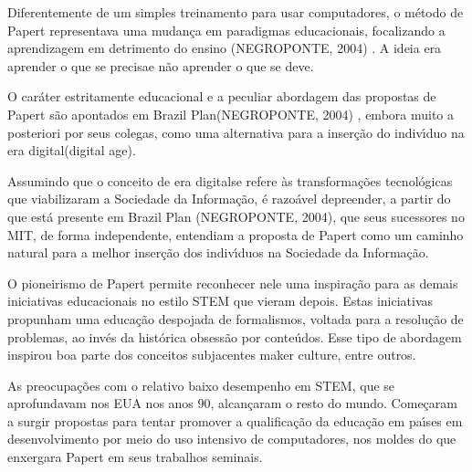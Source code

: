 \documentclass[
12pt,		%
openright,	%
twoside,  %
a4paper,			%
chapter=TITLE,		%
english,			%
french,				%
spanish,			%
brazil				%
]{USPSC-classe/USPSC}
\begin{document}
Diferentemente de um simples treinamento para usar computadores, o m\'etodo de Papert representava uma mudan\c{c}a em paradigmas educacionais, focalizando a aprendizagem em detrimento do ensino  (NEGROPONTE, 2004) . A ideia era \textquotedbl aprender o que se precisa\textquotedbl  e n\~ao \textquotedbl aprender o que se deve\textquotedbl .










O car\'ater estritamente educacional e a peculiar abordagem das propostas de Papert s\~ao apontados em \textquotedbl Brazil Plan\textquotedbl   (NEGROPONTE, 2004) , embora muito a posteriori por seus colegas, como uma alternativa para a inser\c{c}\~ao do indiv\'{\i}duo na \textquotedbl era digital\textquotedbl  (digital age).










Assumindo que o conceito de \textquotedbl era digital\textquotedbl  se refere \`as transforma\c{c}\~oes tecnol\'ogicas que viabilizaram a  \textquotedbl Sociedade da Informa\c{c}\~ao\textquotedbl ,  \'e razo\'avel depreender, a partir do que est\'a presente em Brazil Plan  (NEGROPONTE, 2004), que seus sucessores no MIT, de forma independente, entendiam a proposta de Papert como um caminho natural para a melhor inser\c{c}\~ao dos indiv\'{\i}duos na Sociedade da Informa\c{c}\~ao.










O pioneirismo de Papert permite reconhecer nele uma inspira\c{c}\~ao para as demais iniciativas educacionais no estilo STEM que vieram depois. Estas iniciativas propunham uma educa\c{c}\~ao despojada de formalismos, voltada para a resolu\c{c}\~ao de problemas, ao inv\'es da hist\'orica obsess\~ao por conte\'udos. Esse tipo de abordagem inspirou boa parte dos conceitos subjacentes  \textquotedbl maker culture\textquotedbl , entre outros.










As preocupa\c{c}\~oes com o relativo baixo desempenho em STEM, que se aprofundavam nos EUA nos anos 90, alcan\c{c}aram o resto do mundo. Come\c{c}aram a surgir propostas para tentar promover a qualifica\c{c}\~ao da educa\c{c}\~ao em pa\'{\i}ses em desenvolvimento por meio do uso intensivo de computadores, nos moldes do que enxergara Papert em seus trabalhos seminais.
\end{document}

